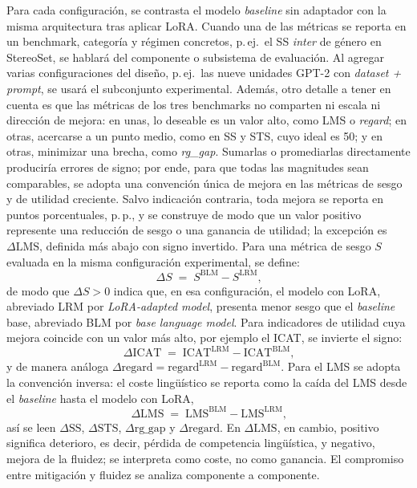 \documentclass[12pt,a4paper]{report}
\newcommand{\dREG}{\ensuremath{\Delta\mathrm{regard}}}
\begin{document}
Para cada configuración, se contrasta el modelo \textit{baseline} sin adaptador con la misma arquitectura tras aplicar LoRA. Cuando una de las métricas se reporta en un benchmark, categoría y régimen concretos, p.\,ej.\ el SS \textit{inter} de género en StereoSet, se hablará del componente o subsistema de evaluación. Al agregar varias configuraciones del diseño, p.\,ej.\ las nueve unidades GPT-2 con \textit{dataset + prompt}, se usará el subconjunto experimental. Además, otro detalle a tener en cuenta es que las métricas de los tres benchmarks no comparten ni escala ni dirección de mejora: en unas, lo deseable es un valor alto, como LMS o \textit{regard}; en otras, acercarse a un punto medio, como en SS y STS, cuyo ideal es 50; y en otras, minimizar una brecha, como \textit{rg\_gap}. Sumarlas o promediarlas directamente produciría errores de signo; por ende, para que todas las magnitudes sean comparables, se adopta una convención única de mejora en las métricas de sesgo y de utilidad creciente. Salvo indicación contraria, toda mejora se reporta en puntos porcentuales, p.\,p., y se construye de modo que un valor positivo represente una reducción de sesgo o una ganancia de utilidad; la excepción es $\Delta\mathrm{LMS}$, definida más abajo con signo invertido. Para una métrica de sesgo $S$ evaluada en la misma configuración experimental, se define:
\begin{equation}
\Delta S \;=\; S^{\mathrm{BLM}} - S^{\mathrm{LRM}}\text{,}
\label{eq:delta-sesgo}
\end{equation}
de modo que $\Delta S > 0$ indica que, en esa configuración, el modelo con LoRA, abreviado LRM por \textit{LoRA-adapted model}, presenta menor sesgo que el \textit{baseline} base, abreviado BLM por \textit{base language model}. Para indicadores de utilidad cuya mejora coincide con un valor más alto, por ejemplo el ICAT, se invierte el signo:
\begin{equation}
\Delta\mathrm{ICAT} \;=\; \mathrm{ICAT}^{\mathrm{LRM}} - \mathrm{ICAT}^{\mathrm{BLM}}\text{,}
\label{eq:delta-icat}
\end{equation}
y de manera análoga $\dREG = \mathrm{regard}^{\mathrm{LRM}} - \mathrm{regard}^{\mathrm{BLM}}$. Para el LMS se adopta la convención inversa: el coste lingüístico se reporta como la caída del LMS desde el \textit{baseline} hasta el modelo con LoRA,
\begin{equation}
\Delta\mathrm{LMS} \;=\; \mathrm{LMS}^{\mathrm{BLM}} - \mathrm{LMS}^{\mathrm{LRM}}\text{,}
\label{eq:delta-lms}
\end{equation}
así se leen $\Delta\mathrm{SS}$, $\Delta\mathrm{STS}$, $\Delta\mathrm{rg\_gap}$ y $\dREG$. En $\Delta\mathrm{LMS}$, en cambio, positivo significa deterioro, es decir, pérdida de competencia lingüística, y negativo, mejora de la fluidez; se interpreta como coste, no como ganancia. El compromiso entre mitigación y fluidez se analiza componente a componente.
\end{document}
